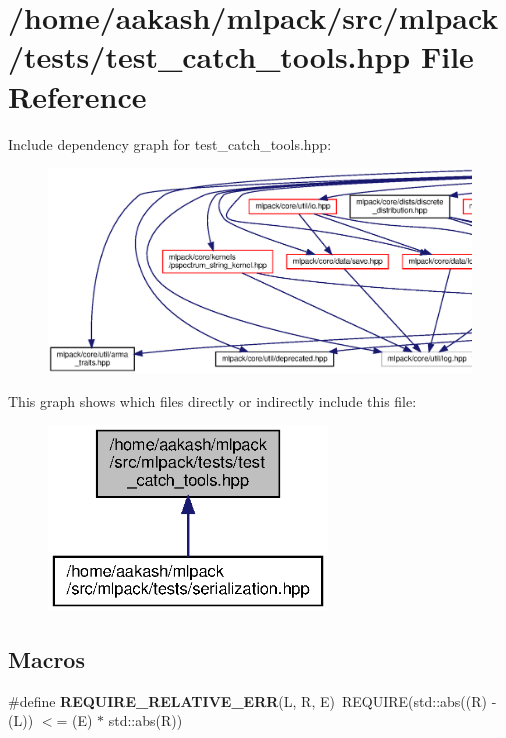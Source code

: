 \section{/home/aakash/mlpack/src/mlpack/tests/test\+\_\+catch\+\_\+tools.hpp File Reference}
\label{test__catch__tools_8hpp}
Include dependency graph for test\+\_\+catch\+\_\+tools.\+hpp\+:
\nopagebreak
\begin{figure}[H]
\begin{center}
\leavevmode
\includegraphics[width=350pt]{test__catch__tools_8hpp__incl}
\end{center}
\end{figure}
This graph shows which files directly or indirectly include this file\+:
\nopagebreak
\begin{figure}[H]
\begin{center}
\leavevmode
\includegraphics[width=210pt]{test__catch__tools_8hpp__dep__incl}
\end{center}
\end{figure}
\subsection*{Macros}
\begin{DoxyCompactItemize}
\item 
\#define \textbf{ R\+E\+Q\+U\+I\+R\+E\+\_\+\+R\+E\+L\+A\+T\+I\+V\+E\+\_\+\+E\+RR}(L,  R,  E)~R\+E\+Q\+U\+I\+RE(std\+::abs((R) -\/ (L)) $<$= (E) $\ast$ std\+::abs(R))
\end{DoxyCompactItemize}
